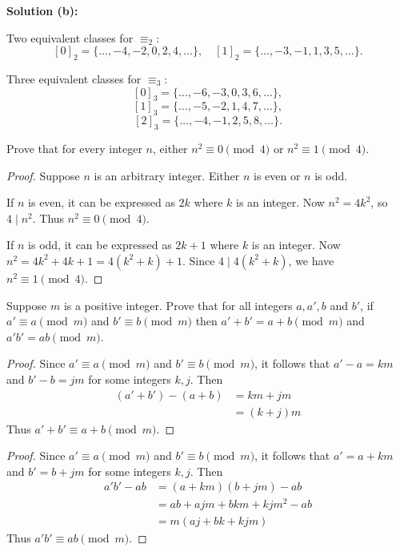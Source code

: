 \textbf{Solution (b):}

Two equivalent classes for $\equiv_2$:
\[
[0]_2 = \{\ldots, -4, -2, 0, 2, 4, \ldots\}, \quad
[1]_2 = \{\ldots, -3, -1, 1, 3, 5, \ldots\}.
\]

Three equivalent classes for $\equiv_3$:
\[
[0]_3 = \{\ldots, -6, -3, 0, 3, 6, \ldots\},
\]
\[
[1]_3 = \{\ldots, -5, -2, 1, 4, 7, \ldots\},
\]
\[
[2]_3 = \{\ldots, -4, -1, 2, 5, 8, \ldots\}.
\]

\begin{tcolorbox}[title=Problem 12, breakable]
    Prove that for every integer $n$, either $n^2 \equiv 0 \pmod{4}$
        or $n^2 \equiv 1 \pmod{4}$.
\end{tcolorbox}

\begin{proof}
    Suppose $n$ is an arbitrary integer.
    Either $n$ is even or $n$ is odd.

    If $n$ is even, it can be expressed as $2k$ where $k$ is an integer.
    Now $n^2 = 4k^2$, so $4 \mid n^2$.
    Thus $n^2 \equiv 0 \pmod{4}$.

    If $n$ is odd, it can be expressed as $2k + 1$ where $k$ is an integer.
    Now $n^2 = 4k^2 + 4k + 1 = 4(k^2 + k) + 1$.
Since $4 \mid 4(k^2 + k)$, we have $n^2 \equiv 1 \pmod{4}$.
\end{proof}

\begin{tcolorbox}[title=Problem 13, breakable]
    Suppose $m$ is a positive integer. 
    Prove that for all integers $a, a', b$ and $b'$,
    if $a' \equiv a \pmod{m}$ and $b' \equiv b \pmod{m}$
    then $a' + b' = a + b \pmod{m}$ and $a'b' = ab \pmod{m}$.
\end{tcolorbox}

\begin{proof}
    Since $a' \equiv a \pmod{m}$ and $b' \equiv b \pmod{m}$,
    it follows that $a' - a = km$ and $b' - b = jm$ for some integers $k,j$.
    Then
    \begin{align*}
        (a' + b') - (a + b) 
            &= km + jm \\ 
            &= (k + j)m
    \end{align*}
    Thus $a' + b' \equiv a + b \pmod{m}$.
\end{proof}

\begin{proof}
    Since $a' \equiv a \pmod{m}$ and $b' \equiv b \pmod{m}$,
    it follows that $a' = a + km$ and $b' = b + jm$ for some integers $k,j$.
    Then 
    \begin{align*}
        a'b' - ab
            &= (a + km)(b + jm) - ab \\
            &= ab + a jm + b km + k j m^2 - ab \\
            &= m (a j + b k + k j m)
    \end{align*}
    Thus $a'b' \equiv ab \pmod{m}$.
\end{proof}

